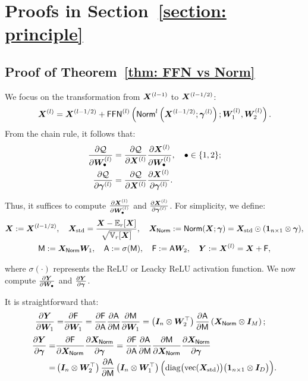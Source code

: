 \section{Proofs in Section~\ref{section: principle}}
\label{appendix: proof: section principle}

\subsection{Proof of Theorem~\ref{thm: FFN vs Norm}}
\label{appendix: proof: thm: FFN vs Norm}

We focus on the transformation from $\bX^{(l-1)}$ to $\bX^{(l-1/2)}$:
$$\bX^{(l)}=\bX^{(l-1/2)}+\FFN^{(l)}\left(\LN^{l}\left(\bX^{(l-1/2)};\bgamma^{(l)}\right);\bW_1^{(l)},\bW_2^{(l)}\right).$$
From the chain rule, it follows that:
\begin{align*}
    \frac{\partial \cQ}{\partial \bW_{\bullet}^{(l)}}&=\frac{\partial \cQ}{\partial \bX^{(l)}}\frac{\partial \bX^{(l)}}{\partial \bW_{\bullet}^{(l)}},\quad \bullet\in\{1,2\};
    \\
    \frac{\partial \cQ}{\partial \bgamma^{(l)}}&=\frac{\partial \cQ}{\partial \bX^{(l)}}\frac{\partial \bX^{(l)}}{\partial\bgamma^{(l)}}.
\end{align*}


Thus, it suffices to compute $\frac{\partial \bX^{(l)}}{\partial\bW_{\bullet}^{(l)}}$ and $\frac{\partial \bX^{(l)}}{\partial\bgamma^{(l)}}$.
For simplicity, we define:
\begin{gather*}
    \bX:=\bX^{(l-1/2)},\quad
    \bX_{\rm std}=\frac{\bX-\bbE_r[\bX]}{\sqrt{\bbV_r[\bX]}},\quad
    \bX_\LN:=\LN(\bX;\bgamma)=\bX_{\rm std}\odot(\bone_{n\times 1}\otimes\bgamma),
    \\
    \MSA:=\bX_{\LN}\bW_1,\quad
    \ASA:=\sigma(\MSA),\quad
    \FFFN:=\ASA\bW_2,
    \quad
    \bY:=\bX^{(l)}=\bX+\FFFN,
\end{gather*}

where $\sigma(\cdot)$ represents the ReLU or Leacky ReLU activation function.
We now compute $\frac{\partial \bY}{\partial\bW_{\bullet}}$ and $\frac{\partial \bY}{\partial\bgamma}$.

It is straightforward that:
\begin{align*}
    \frac{\partial \bY}{\partial\bW_{1}}=&\frac{\partial\FFFN}{\partial\bW_{1}}=\frac{\partial\FFFN}{\partial\ASA}\frac{\partial\ASA}{\partial\MSA}\frac{\partial\MSA}{\partial\bW_{1}}=\left(\bI_{n}\otimes\bW_2^\top\right)\frac{\partial\ASA}{\partial\MSA}\left(\bX_{\LN}\otimes\bI_M\right);
\end{align*}
\begin{align*}
    \frac{\partial \bY}{\partial\bgamma}=&\frac{\partial\FFFN}{\partial\bX_{\LN}}\frac{\partial\bX_{\LN}}{\partial\bgamma}=\frac{\partial\FFFN}{\partial\ASA}\frac{\partial\ASA}{\partial\MSA}\frac{\partial\MSA}{\partial\bX_{\LN}}\frac{\partial\bX_{\LN}}{\partial\bgamma}
    \\=&\left(\bI_{n}\otimes\bW_2^\top\right)\frac{\partial\ASA}{\partial\MSA}\left(\bI_n\otimes\bW_1^\top\right)\Big(\diag\big(\vec(\bX_{\rm std})\big)\big(\bone_{n\times 1}\otimes \bI_{D}\big)\Big).
\end{align*}


